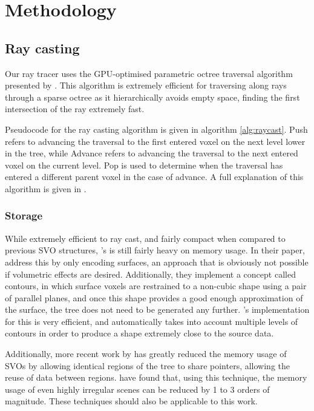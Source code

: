 \chapter{Methodology}
\label{methodology}

\section{Ray casting}
Our ray tracer uses the GPU-optimised parametric octree traversal algorithm presented by \cite{laine10efficientsvos}. This algorithm is extremely efficient for traversing along rays through a sparse octree as it hierarchically avoids empty space, finding the first intersection of the ray extremely fast.

Pseudocode for the ray casting algorithm is given in algorithm \ref{alg:raycast}. Push refers to advancing the traversal to the first entered voxel on the next level lower in the tree, while Advance refers to advancing the traversal to the next entered voxel on the current level. Pop is used to determine when the traversal has entered a different parent voxel in the case of advance. A full explanation of this algorithm is given in \cite{laine10efficientsvos}.

\subsection{Storage}
While extremely efficient to ray cast, and fairly compact when compared to previous SVO structures, \citeauthor{laine10efficientsvos}'s is still fairly heavy on memory usage. In their paper, \citeauthor{laine10efficientsvos} address this by only encoding surfaces, an approach that is obviously not possible if volumetric effects are desired. Additionally, they implement a concept called contours, in which surface voxels are restrained to a non-cubic shape using a pair of parallel planes, and once this shape provides a good enough approximation of the surface, the tree does not need to be generated any further. \citeauthor{laine10efficientsvos}'s implementation for this is very efficient, and automatically takes into account multiple levels of contours in order to produce a shape extremely close to the source data.

Additionally, more recent work by \citeauthor{kampe2013dags} has greatly reduced the memory usage of SVOs by allowing identical regions of the tree to share pointers, allowing the reuse of data between regions. \citeauthor{kampe2013dags} have found that, using this technique, the memory usage of even highly irregular scenes can be reduced by 1 to 3 orders of magnitude. These techniques should also be applicable to this work.

